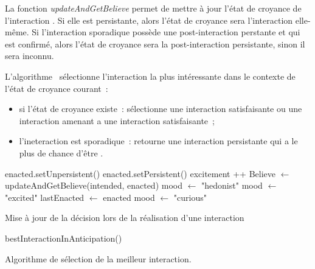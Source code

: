 \documentclass{llncs}
\begin{document}
La fonction \emph{updateAndGetBelieve} permet de mettre à jour l'état de croyance de l'interaction \enact. Si elle est persistante, alors l'état de croyance sera l'interaction elle-même. Si l'interaction sporadique possède une post-interaction perstante et qui est confirmé, alors l'état de croyance sera la post-interaction persistante, sinon il sera inconnu. 

L'algorithme~ sélectionne l'interaction la plus intéressante dans le contexte de l'état de croyance courant~:
\begin{itemize}
	\item si l'état de croyance existe~: sélectionne une interaction satisfaisante ou une interaction amenant a une interaction satisfaisante~;
	\item l'ineteraction est sporadique~: retourne une interaction persistante qui a le plus de chance d'être \enact.
\end{itemize}

%
\begin{algorithm}[h]
	\SetAlgoLined
	\DontPrintSemicolon
	{
		 {
			 {
				enacted.setUnpersistent()\;
			} {
			 {
				enacted.setPersistent()\;
			} {
			excitement ++\;
		}
	}
}
Believe $\leftarrow$ updateAndGetBelieve(intended, enacted)\;
 {
	mood $\leftarrow$ "hedonist"\;
} 
 {
	mood $\leftarrow$ "excited"\;
	lastEnacted $\leftarrow$ enacted\;
} {
 {
	mood $\leftarrow$ "curious"\;
}
}
\KwRet\;
}
\caption{Mise à jour de la décision lors de la réalisation d'une interaction}
\label{alg:minimum_algorithm_enacted}
\end{algorithm}

\begin{algorithm}[h]
	\SetAlgoLined
	\DontPrintSemicolon
	 {
		 {
		} {
	}
\KwRet bestInteractionInAnticipation()\;
}
\caption{Algorithme de sélection de la meilleur interaction.}
\label{alg:maxExpectedOutcomeValence}
\end{algorithm}
\end{document}
